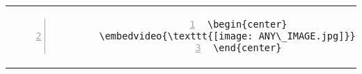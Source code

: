 \begin{table}[h!]
\begin{tabular}{c | c}
\begin{minipage}[m]{0.55\textwidth}
\begin{lstlisting}[numberstyle=\zebra{orange!15}{red!15},numbers=left,basicstyle=\ttfamily\tiny]
\begin{center}
        \embedvideo{\texttt{[image: ANY\_IMAGE.jpg]}}{ANY_VIDEO.mp4}
\end{center}

\end{lstlisting}
\end{minipage}
\end{tabular}
\end{table}
 